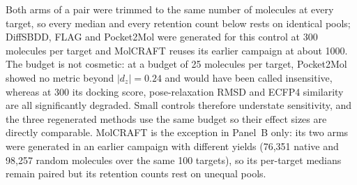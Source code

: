 Both arms of a pair were trimmed to the same number of molecules at every target, so every median and every retention count below rests on identical pools; DiffSBDD, FLAG and Pocket2Mol were generated for this control at 300 molecules per target and MolCRAFT reuses its earlier campaign at about 1000. The budget is not cosmetic: at a budget of 25 molecules per target, Pocket2Mol showed no metric beyond $|d_z|=0.24$ and would have been called insensitive, whereas at 300 its docking score, pose-relaxation RMSD and ECFP4 similarity are all significantly degraded. Small controls therefore understate sensitivity, and the three regenerated methods use the same budget so their effect sizes are directly comparable. MolCRAFT is the exception in Panel~B only: its two arms were generated in an earlier campaign with different yields (76,351 native and 98,257 random molecules over the same 100 targets), so its per-target medians remain paired but its retention counts rest on unequal pools.
